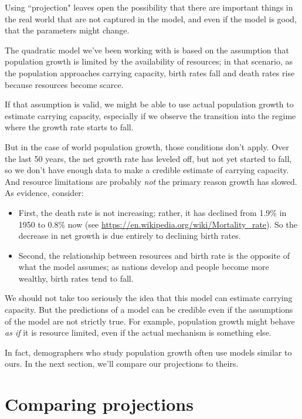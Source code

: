 \documentclass[12pt]{book}
\theoremstyle{exercise}
\begin{document}
Using ``projection" leaves open the possibility that there are important things in the real world that are not captured in the model, and even if the model is good, that the parameters might change.

The quadratic model we've been working with is based on the assumption that population growth is limited by the availability of resources; in that scenario, as the population approaches carrying capacity, birth rates fall and death rates rise because resources become scarce.

If that assumption is valid, we might be able to use actual population growth to estimate carrying capacity, especially if we observe the transition into the regime where the growth rate starts to fall.

But in the case of world population growth, those conditions don't apply.  Over the last 50 years, the net growth rate has leveled off, but not yet started to fall, so we don't have enough data to make a credible estimate of carrying capacity.  And resource limitations are probably {\em not} the primary reason growth has slowed.  As evidence, consider:

\begin{itemize}

\item First, the death rate is not increasing; rather, it has declined from 1.9\% in 1950 to 0.8\% now (see \url{https://en.wikipedia.org/wiki/Mortality_rate}).  So the decrease in net growth is due entirely to declining birth rates.

\item Second, the relationship between resources and birth rate is the opposite of what the model assumes; as nations develop and people become more wealthy, birth rates tend to fall.  

\end{itemize} 

We should not take too seriously the idea that this model can estimate carrying capacity.  But the predictions of a model can be credible even if the assumptions of the model are not strictly true.  For example, population growth might behave {\em as if} it is resource limited, even if the actual mechanism is something else.

In fact, demographers who study population growth often use models similar to ours.  In the next section, we'll compare our projections to theirs.


\section{Comparing projections}
\end{document}
